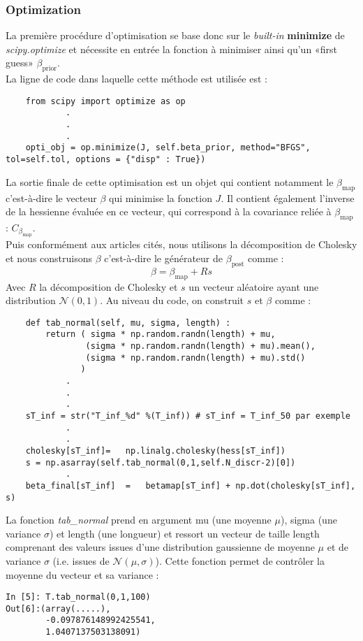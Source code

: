 \documentclass[a4paper,12pt]{article}
\newcommand{\bepar}[1]{
	\left( #1 \right)  
}
\newcommand\bk{\color{black}}
\newcommand\navy{\color{navy}}
\newcommand{\cad}{c'est-à-dire}
\numberwithin{equation}{section} %
\begin{document}
\navy\subsubsection*{Optimization}\bk
\noindent La première procédure d'optimisation se base donc sur le \textit{built-in} \textbf{minimize} de \textit{scipy.optimize} et nécessite en entrée la fonction à minimiser ainsi qu'un «first guess» $\beta_{\text{prior}}$.\\
La ligne de code dans laquelle cette méthode est utilisée est :
\begin{lstlisting}
	from scipy import optimize as op
			.
			.
			.
	opti_obj = op.minimize(J, self.beta_prior, method="BFGS", tol=self.tol, options = {"disp" : True})
\end{lstlisting}

\noindent La sortie finale de cette optimisation est un objet qui contient notamment le $\beta_{\text{map}}$ \cad $ $ le vecteur $\beta$ qui minimise la fonction $J$. Il contient également l'inverse de la hessienne évaluée en ce vecteur, qui correspond à la covariance reliée à $\beta_{\text{map}}$ : $C_{\beta_{\text{map}}}$. \\
\noindent Puis conformément aux articles cités, nous utilisons la décomposition de Cholesky et nous construisons $\beta$ \cad $ $ le générateur de $\beta_{\text{post}}$ comme : 
\begin{equation}
\beta = \beta_{\text{map}} + Rs \label{bf}
\end{equation}  
Avec $R$ la décomposition de Cholesky et $s$ un vecteur aléatoire ayant une distribution $\mathcal{N}\bepar{0,1}$. Au niveau du code, on construit $s$ et $\beta$ comme : 
\begin{lstlisting}
	def tab_normal(self, mu, sigma, length) :
        return ( sigma * np.random.randn(length) + mu, 
                (sigma * np.random.randn(length) + mu).mean(), 
                (sigma * np.random.randn(length) + mu).std()
               ) 	
			.
			.
			.
	sT_inf = str("T_inf_%d" %(T_inf)) # sT_inf = T_inf_50 par exemple
			.
			.	
	cholesky[sT_inf]=   np.linalg.cholesky(hess[sT_inf])
	s = np.asarray(self.tab_normal(0,1,self.N_discr-2)[0])
			.
	beta_final[sT_inf]  =   betamap[sT_inf] + np.dot(cholesky[sT_inf], s)
\end{lstlisting}

\noindent La fonction \textit{tab\_normal} prend en argument mu (une moyenne $\mu$), sigma (une variance $\sigma$) et length (une longueur) et ressort un vecteur de taille length comprenant des valeurs issues d'une distribution gaussienne de moyenne $\mu$ et de variance $\sigma$ (i.e. issues de $\mathcal{N}\bepar{\mu,\sigma}$). Cette fonction permet de contrôler la moyenne du vecteur et sa variance :
\begin{lstlisting}
In [5]: T.tab_normal(0,1,100)
Out[6]:(array(.....),
		-0.097876148992425541,
 		1.0407137503138091)
\end{lstlisting}
\end{document}
